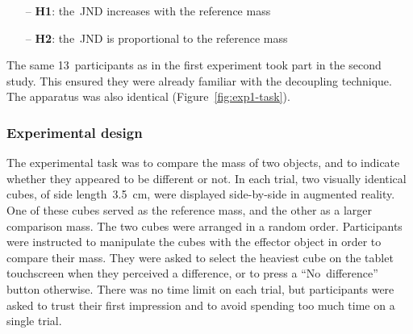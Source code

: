 \documentclass{vgtc}
\begin{document}
\begin{itemize}
\item[--] \textbf{H1}: the~JND increases with the reference mass
\item[--] \textbf{H2}: the~JND is proportional to the reference mass
\end{itemize}

The same 13~participants as in the first experiment took part in the second study. This ensured they were already familiar with the decoupling technique. The apparatus was also identical (Figure~\ref{fig:exp1-task}).

\subsubsection{Experimental design}

The experimental task was to compare the mass of two objects, and to indicate whether they appeared to be different or not. In each trial, two visually identical cubes, of side length~\SI{3.5}{\centi\meter}, were displayed side-by-side in augmented reality. One of these cubes served as the reference mass, and the other as a larger comparison mass. The two cubes were arranged in a random order. Participants were instructed to manipulate the cubes with the effector object in order to compare their mass. They were asked to select the heaviest cube on the tablet touchscreen when they perceived a difference, or to press a ``No~difference'' button otherwise. There was no time limit on each trial, but participants were asked to trust their first impression and to avoid spending too much time on a single trial.
\end{document}
